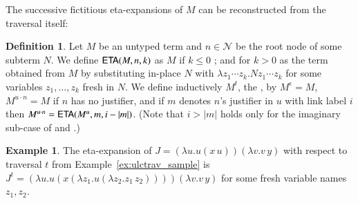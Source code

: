 \documentclass{elsarticle}
\newif\iflongversion
\theoremstyle{plain}
\theoremstyle{definition}
\newtheorem{definition}{Definition}[section]
\newtheorem{example}{Example}[section]
\newcommand\Nodes{\mathcal{N}}%
\newcommand{\ctree}{\Tau} %
\begin{document}
The successive fictitious eta-expansions of $M$ can be reconstructed from the traversal itself:
\begin{definition}
\label{def:onthefly_etaexpansion}
Let $M$ be an untyped term and $n\in \Nodes$ be the root node of some subterm $N$. We define ${\sf ETA}(M, n, k)$ as $M$
if $k \leq 0$ ; and for $k> 0$ as the term obtained from $M$ by substituting in-place $N$ with $\lambda z_1 \cdots z_k. N z_1 \cdots z_k$ for some variables $z_1, \ldots, z_k$ fresh in $N$.
%
We define inductively $M^t$,  the , by $M^\epsilon = M$,
$M^{u \cdot n} = M$ if $n$ has no justifier, and if $m$ denotes $n$'s justifier in $u$ with link label $i$ then $M^{u \cdot n} = {\sf ETA}(M^{u}, m, i-|m|)$.
%
(Note that $i>|m|$ holds only for the imaginary sub-case of  and .)
\end{definition}

\iflongversion
It follows that $M$ is a sub-tree of $M^t$: paths in $\ctree(M)$ are also paths in $\ctree(M^t)$.
\fi

\begin{example}
The eta-expansion of $J = (\lambda u . u(x\,u)) (\lambda v . v\,y)$ with respect to traversal $t$ from Example~\ref{ex:ulctrav_sample} is
$J^t = (\lambda u . u(x (\lambda z_1. u (\lambda z_2.z_1\,z_2)))) (\lambda v . v\,y)$
for some fresh variable names $z_1, z_2$.
\end{example}
\end{document}
